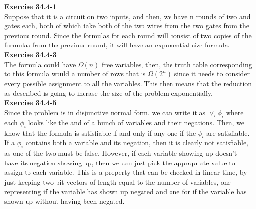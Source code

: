 \documentclass{article}
\begin{document}
\noindent\textbf{Exercise 34.4-1}\\

Suppose that it is a circuit on two inputs, and then, we have n rounds of two and gates each, both of which take both of the two wires from the two gates from the previous round. Since the formulas for each round will consist of two copies of the formulas from the previous round, it will have an exponential size formula.\\



\noindent\textbf{Exercise 34.4-3}\\

The formula could have $\Omega(n)$ free variables, then, the truth table corresponding to this formula would a number of rows that is $\Omega(2^n)$ since it needs to consider every possible assignment to all the variables. This then means that the reduction as described is going to incrase the size of the problem exponentially.\\



\noindent\textbf{Exercise 34.4-5}\\

Since the problem is in disjunctive normal form, we can write it as $\vee_i \phi_i$ where each $\phi_i$ looks like the and of a bunch of variables and their negations. Then, we know that the formula is satisfiable if and only if any one if the $\phi_i$ are satisfiable. If a $\phi_i$ contains both a variable and its negation, then it is clearly not satisfiable, as one of the two must be false. However, if each variable showing up doesn't have its negation showing up, then we can just pick the appropriate value to assign to each variable. This is a property that can be checked in linear time, by just keeping two bit vectors of length equal to the number of variables, one representing if the variable has shown up negated and one for if the variable has shown up without having been negated.\\
\end{document}
